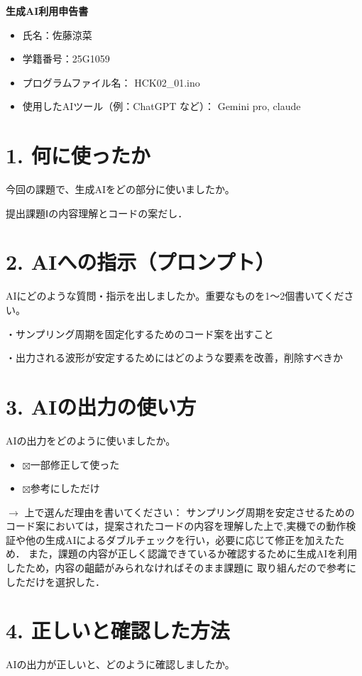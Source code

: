 \documentclass[a4paper,11pt,dvipdfmx]{jsarticle}
\newcommand{\cboxon}{$\boxtimes$}
\begin{document}
{\LARGE\bfseries 生成AI利用申告書}
\vspace{1em}

\begin{itemize}
  \item 氏名：佐藤涼菜
  \item 学籍番号：25G1059
  \item プログラムファイル名： HCK02\_01.ino
  \item 使用したAIツール（例：ChatGPT など）： Gemini pro, claude
\end{itemize}

\section*{1. 何に使ったか}
今回の課題で、生成AIをどの部分に使いましたか。


提出課題Ⅰの内容理解とコードの案だし．

\section*{2. AIへの指示（プロンプト）}
AIにどのような質問・指示を出しましたか。重要なものを1〜2個書いてください。

・サンプリング周期を固定化するためのコード案を出すこと\par
・出力される波形が安定するためにはどのような要素を改善，削除すべきか

\section*{3. AIの出力の使い方}
AIの出力をどのように使いましたか。
\begin{itemize}
  \item \cboxon 一部修正して使った
  \item \cboxon 参考にしただけ
\end{itemize}
$\rightarrow$ 上で選んだ理由を書いてください：
サンプリング周期を安定させるためのコード案においては，提案されたコードの内容を理解した上で,実機での動作検証や他の生成AIによるダブルチェックを行い，必要に応じて修正を加えたため．
また，課題の内容が正しく認識できているか確認するために生成AIを利用したため，内容の齟齬がみられなければそのまま課題に
取り組んだので参考にしただけを選択した．

\section*{4. 正しいと確認した方法}
AIの出力が正しいと、どのように確認しましたか。
\end{document}
